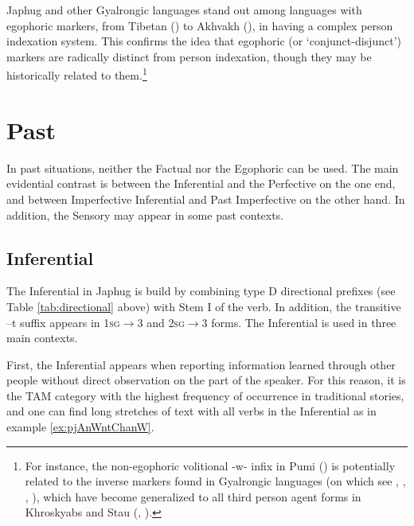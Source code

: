 \documentclass[oldfontcommands,oneside,a4paper,11pt]{article}
\newcommand{\ipa}[1]{{\phon \mbox{#1}}} %
\begin{document}
Japhug and other Gyalrongic languages stand out among languages with egophoric markers, from Tibetan (\citealt{tournadre08conjunct}) to Akhvakh (\citealt{creissels08akhvakh}), in having  a complex person indexation system. This confirms the idea that egophoric (or `conjunct-disjunct') markers are radically distinct from person indexation, though they may be historically related to them.\footnote{For instance, the non-egophoric volitional \ipa{-w-} infix in Pumi (\citealt{daudey14volition}) is potentially related to the inverse markers found in Gyalrongic languages (on which see \citealt{delancey81direction}, \citealt{jackson02rentongdengdi}, \citealt{jacques10inverse}, \citealt{gongxun14agreement}), which have become generalized to all third person agent forms in Khroskyabs and Stau (\citealt{jacques14rtau}, \citealt{lai14person}).}

 
\section{Past} \label{sec:evd:pst}
In past situations, neither the Factual nor the Egophoric  can be used. The main evidential contrast is between the Inferential and the Perfective on the one end, and between Imperfective Inferential and Past Imperfective on the other hand. In addition, the Sensory may appear in some past contexts.


\subsection{Inferential}  \label{sec:ifr}
The Inferential in Japhug is build by combining type D directional prefixes (see Table \ref{tab:directional} above) with Stem I of the verb. In addition, the transitive \ipa{--t} suffix appears in \textsc{1sg}$\rightarrow$3 and \textsc{2sg}$\rightarrow$3 forms. The Inferential is used in three main contexts. 


First, the Inferential appears when reporting information learned through other people without direct observation on the part of the speaker. For this reason, it is the TAM category with the highest frequency of occurrence in traditional stories, and one can find long stretches of text with all verbs in the Inferential as in example \ref{ex:pjAnWntChanW}.
\end{document}
